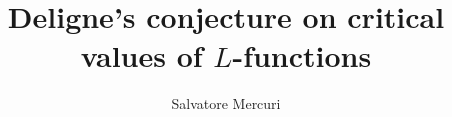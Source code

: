 

\title{Deligne's conjecture on critical values of $L$-functions}
\author{Salvatore Mercuri}
\maketitle





